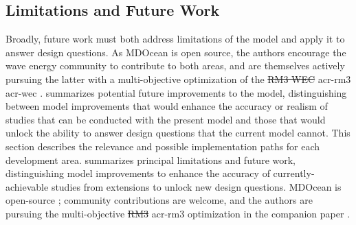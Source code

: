 \documentclass[a4paper,fleqn,colorlinks,unicode,lineno]{cas-dc} %
\makeatletter
\providecommand{\DIFdeltex}[1]{{\protect\color{red}\sout{#1}}} %
\providecommand{\DIFaddbegin}{} %
\providecommand{\DIFaddend}{} %
\providecommand{\DIFdelbegin}{} %
\providecommand{\DIFdelend}{} %
\providecommand{\DIFdel}[1]{\texorpdfstring{\DIFdeltex{#1}}{}} %
\providecommand{\DIFscaledelfig}{0.5}
\newlength{\DIFdelgraphicswidth} %
\newlength{\DIFdelgraphicsheight} %
\providecommand{\DIFaddincludegraphics}[2][]{{\color{blue}\fbox{\DIFOincludegraphics[#1]{#2}}}} %
\providecommand{\DIFdelincludegraphics}[2][]{%
\sbox{\DIFdelgraphicsbox}{\DIFOincludegraphics[#1]{#2}}%
\settoboxwidth{\DIFdelgraphicswidth}{\DIFdelgraphicsbox} %
\settoboxtotalheight{\DIFdelgraphicsheight}{\DIFdelgraphicsbox} %
\scalebox{\DIFscaledelfig}{%
\parbox[b]{\DIFdelgraphicswidth}{\usebox{\DIFdelgraphicsbox}\\[-\baselineskip] \rule{\DIFdelgraphicswidth}{0em}}\llap{\resizebox{\DIFdelgraphicswidth}{\DIFdelgraphicsheight}{%
\setlength{\unitlength}{\DIFdelgraphicswidth}%
\begin{picture}(1,1)%
\thicklines\linethickness{2pt} %
{\color[rgb]{1,0,0}\put(0,0){\framebox(1,1){}}}%
{\color[rgb]{1,0,0}\put(0,0){\line( 1,1){1}}}%
{\color[rgb]{1,0,0}\put(0,1){\line(1,-1){1}}}%
\end{picture}%
}\hspace*{3pt}}} %
} %
\DeclareRobustCommand{\DIFaddbegin}{\DIFOaddbegin \let\includegraphics\DIFaddincludegraphics} %
\DeclareRobustCommand{\DIFaddend}{\DIFOaddend \let\includegraphics\DIFOincludegraphics} %
\DeclareRobustCommand{\DIFdelbegin}{\DIFOdelbegin \let\includegraphics\DIFdelincludegraphics} %
\DeclareRobustCommand{\DIFdelend}{\DIFOaddend \let\includegraphics\DIFOincludegraphics} %
\let\sout@orig\sout %
\renewcommand{\sout}[1]{\ifmmode\text{\sout@orig{\ensuremath{#1}}}\else\sout@orig{#1}\fi} %
\makeatother
\begin{document}
\subsection{Limitations and Future Work}\label{sec:unmodeled-effects}
\ifdefined\DISSERTATION
    Broadly, future work must both address limitations of the model and apply it to answer design questions.
    As MDOcean is open source, the authors encourage the wave energy community to contribute to both areas, and are themselves actively pursuing the latter with a multi-objective optimization of the \DIFdelbegin \DIFdel{RM3 WEC }\DIFdelend \DIFaddbegin \gls{acr-rm3} \gls{acr-wec} \DIFaddend \citep{mccabe_leveraging_2026}.
     summarizes potential future improvements to the model, distinguishing between model improvements that would enhance the accuracy or realism of studies that can be conducted with the present model and those that would unlock the ability to answer design questions that the current model cannot.
    This section describes the relevance and possible implementation paths for each development area.
\else
     summarizes principal limitations and future work, distinguishing model improvements to enhance the accuracy of currently-achievable studies from extensions to unlock new design questions.
    MDOcean is open-source \citep{mccabe_mdocean_2024}; community contributions are welcome, and the authors are pursuing the multi-objective \DIFdelbegin \DIFdel{RM3 }\DIFdelend \DIFaddbegin \gls{acr-rm3} \DIFaddend optimization in the companion paper \citep{mccabe_leveraging_2026}.
\fi

\DIFdelbegin %
\DIFdelend \DIFaddbegin \newcommand{\modelTrustBuilders}{
    \begin{enumerate}[leftmargin=*]
        \item Surge force and mooring cost
        \item Nonlinear storm wave forces
        \item Irregular waves
        \item Structure: thinner plates, better validation
        \item Additional \gls{acr-pto} nonlinearities
    \end{enumerate}
}
\DIFaddend 
\end{document}
